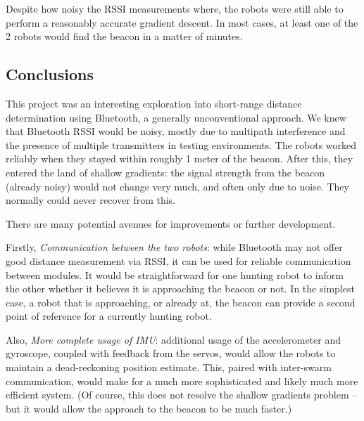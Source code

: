 \documentclass[]{article}
\begin{document}
Despite how noisy the RSSI measurements where, the robots were still
able to perform a reasonably accurate gradient descent. In most cases,
at least one of the 2 robots would find the beacon in a matter of
minutes.

\subsection{Conclusions}

This project was an interesting exploration into short-range distance
determination using Bluetooth, a generally unconventional approach.
We knew that Bluetooth RSSI would be noisy, mostly due to multipath interference and the presence of multiple transmitters in testing environments.
The robots worked reliably when they stayed within roughly 1 meter of the beacon.
After this, they entered the land of shallow gradients:
the signal strength from the beacon (already noisy) would not change very
much, and often only due to noise.
They normally could never recover from this.



There are many potential avenues for improvements or further
development.

Firstly, \emph{Communication between the two robots}: while Bluetooth may not offer good distance measurement via RSSI, it can be used for reliable  communication between modules.
It would be straightforward for one hunting robot to inform the other whether it believes it is approaching the beacon or not.
In the simplest case, a robot that is approaching, or already at, the beacon can provide a second point of reference for a currently hunting robot.

Also, \emph{More complete usage of IMU}: additional usage of the accelerometer and gyroscope, coupled with feedback from the servos, would allow the robots to maintain a dead-reckoning position estimate.
This, paired with inter-swarm communication, would make for a much more sophisticated and likely much more efficient system.
(Of course, this does not resolve the shallow gradients problem -- but it would allow the approach to the beacon to be much faster.)

{}

\end{document}
